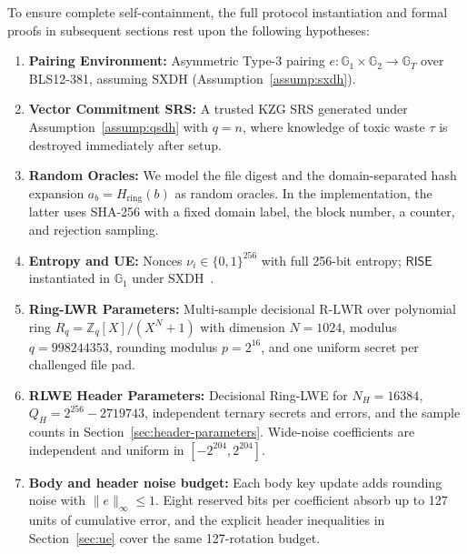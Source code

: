 To ensure complete self-containment, the full protocol instantiation and formal proofs in subsequent sections rest upon the following hypotheses:
\begin{enumerate}
    \item \textbf{Pairing Environment:} Asymmetric Type-3 pairing $e: \mathbb{G}_1 \times \mathbb{G}_2 \to \mathbb{G}_T$ over BLS12-381, assuming $\mathrm{SXDH}$ (Assumption~\ref{assump:sxdh}).
    \item \textbf{Vector Commitment SRS:} A trusted KZG $\mathrm{SRS}$ generated under Assumption~\ref{assump:qsdh} with $q = n$, where knowledge of toxic waste $\tau$ is destroyed immediately after setup.
    \item \textbf{Random Oracles:} We model the file digest and the domain-separated hash expansion $a_b=H_{\mathrm{ring}}(b)$ as random oracles. In the implementation, the latter uses SHA-256 with a fixed domain label, the block number, a counter, and rejection sampling.
    \item \textbf{Entropy and UE:} Nonces $\nu_i \in \{0,1\}^{256}$ with full 256-bit entropy; $\mathsf{RISE}$ instantiated in $\mathbb{G}_1$ under $\mathrm{SXDH}$~\cite{LT18}.
    \item \textbf{Ring-LWR Parameters:} Multi-sample decisional $\text{R-LWR}$ over polynomial ring $R_q = \mathbb{Z}_q[X]/(X^N+1)$ with dimension $N = 1024$, modulus $q = 998244353$, rounding modulus $p = 2^{16}$, and one uniform secret per challenged file pad.
    \item \textbf{RLWE Header Parameters:} Decisional Ring-LWE for $N_H=16384$, $Q_H=2^{256}-2719743$, independent ternary secrets and errors, and the sample counts in Section~\ref{sec:header-parameters}. Wide-noise coefficients are independent and uniform in $[-2^{204},2^{204}]$.
    \item \textbf{Body and header noise budget:} Each body key update adds rounding noise with $\|e\|_\infty\le1$. Eight reserved bits per coefficient absorb up to 127 units of cumulative error, and the explicit header inequalities in Section~\ref{sec:ue} cover the same 127-rotation budget.
\end{enumerate}
